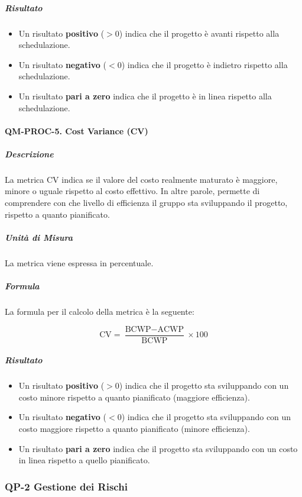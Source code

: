 			\subparagraph{Risultato}
			\begin{itemize}
				\item Un risultato \textbf{positivo} (\(> 0\)) indica che il progetto è avanti rispetto alla schedulazione.
				\item Un risultato \textbf{negativo} (\(< 0\)) indica che il progetto è indietro rispetto alla schedulazione.
				\item Un risultato \textbf{pari a zero} indica che il progetto è in linea rispetto alla schedulazione.
			\end{itemize}

		\paragraph{QM-PROC-5. Cost Variance (CV)}

			\subparagraph{Descrizione}
			La metrica CV indica se il valore del costo realmente maturato è maggiore, minore o uguale rispetto al costo effettivo. In altre parole, permette di comprendere con che livello di efficienza il gruppo sta sviluppando il progetto, rispetto a quanto pianificato.

			\subparagraph{Unità di Misura}
			La metrica viene espressa in percentuale.

			\subparagraph{Formula}
			La formula per il calcolo della metrica è la seguente:

			\[
				\text{CV} = \frac{\text{BCWP} - \text{ACWP}}{\text{BCWP}} \times 100
			\]

			\subparagraph{Risultato}
			\begin{itemize}
				\item Un risultato \textbf{positivo} (\(> 0\)) indica che il progetto sta sviluppando con un costo minore rispetto a quanto pianificato (maggiore efficienza).
				\item Un risultato \textbf{negativo} (\(< 0\)) indica che il progetto sta sviluppando con un costo maggiore rispetto a quanto pianificato (minore efficienza).
				\item Un risultato \textbf{pari a zero} indica che il progetto sta sviluppando con un costo in linea rispetto a quello pianificato.
			\end{itemize}
	
	\subsubsection{QP-2 Gestione dei Rischi}

